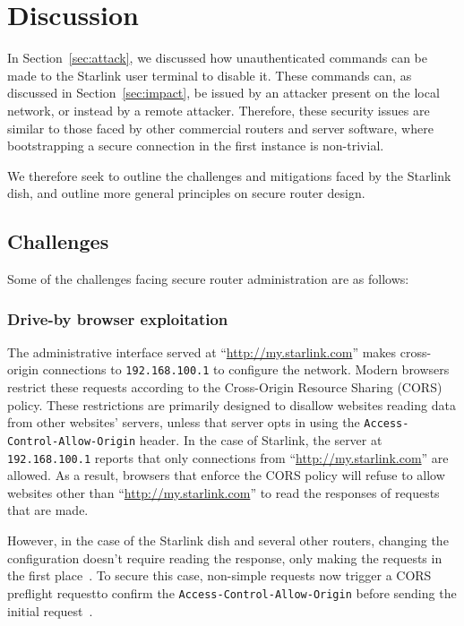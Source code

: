 \section{Discussion}\label{sec:discussion}

In Section~\ref{sec:attack}, we discussed how unauthenticated commands can be made to the Starlink user terminal to disable it.
These commands can, as discussed in Section~\ref{sec:impact}, be issued by an attacker present on the local network, or instead by a remote attacker.
Therefore, these security issues are similar to those faced by other commercial routers and server software, where bootstrapping a secure connection in the first instance is non-trivial.

We therefore seek to outline the challenges and mitigations faced by the Starlink dish, and outline more general principles on secure router design.

\subsection{Challenges}

Some of the challenges facing secure router administration are as follows:

\subsubsection{Drive-by browser exploitation}

The administrative interface served at ``\url{http://my.starlink.com}'' makes cross-origin connections to \texttt{192.168.100.1} to configure the network.
Modern browsers restrict these requests according to the Cross-Origin Resource Sharing (CORS) policy.
These restrictions are primarily designed to disallow websites reading data from other websites' servers, unless that server opts in using the \texttt{Access-Control-Allow-Origin} header.
In the case of Starlink, the server at \texttt{192.168.100.1} reports that only connections from ``\url{http://my.starlink.com}'' are allowed.
As a result, browsers that enforce the CORS policy will refuse to allow websites other than ``\url{http://my.starlink.com}'' to read the responses of requests that are made.

However, in the case of the Starlink dish and several other routers, changing the configuration doesn't require reading the response, only making the requests in the first place~\cite{drive_by_pharming}.
To secure this case, non-simple requests now trigger a CORS preflight requestto confirm the \texttt{Access-Control-Allow-Origin} before sending the initial request~\cite{simple_requests, preflight_request}.

